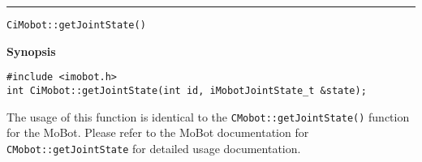 \noindent
\vspace{5pt}
\rule{6.5in}{0.015in}
\noindent
{\LARGE \texttt{CiMobot::getJointState()}}\\
{}

\noindent
{\bf Synopsis}\\
\begin{verbatim}
#include <imobot.h>
int CiMobot::getJointState(int id, iMobotJointState_t &state);
\end{verbatim}

The usage of this function is identical to the
\texttt{CMobot::getJointState()} function for the MoBot. Please refer
to the MoBot documentation for \texttt{CMobot::getJointState} for
detailed usage documentation.

